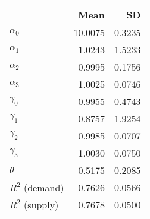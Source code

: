 
\begin{tabular}[t]{lrr}
\toprule
  & Mean & SD\\
\midrule
$\alpha_{0}$ & 10.0075 & 0.3235\\
$\alpha_{1}$ & 1.0243 & 1.5233\\
$\alpha_{2}$ & 0.9995 & 0.1756\\
$\alpha_{3}$ & 1.0025 & 0.0746\\
$\gamma_{0}$ & 0.9955 & 0.4743\\
$\gamma_{1}$ & 0.8757 & 1.9254\\
$\gamma_{2}$ & 0.9985 & 0.0707\\
$\gamma_{3}$ & 1.0030 & 0.0750\\
$\theta$ & 0.5175 & 0.2085\\
$R^{2}$ (demand) & 0.7626 & 0.0566\\
$R^{2}$ (supply) & 0.7678 & 0.0500\\
\bottomrule
\end{tabular}
